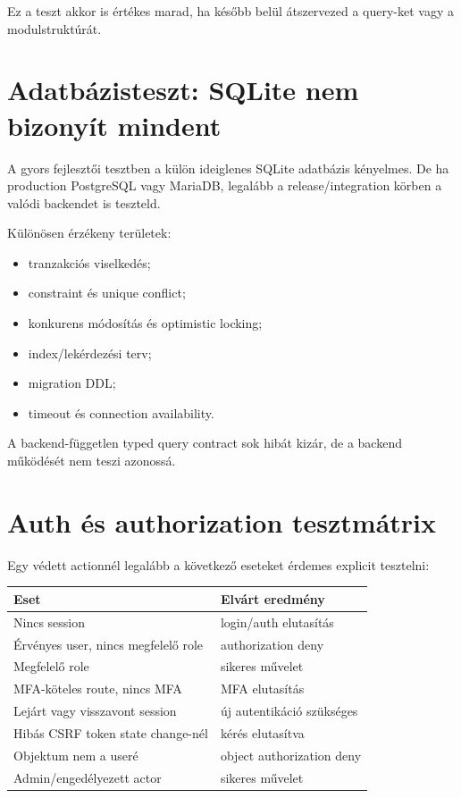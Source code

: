 Ez a teszt akkor is értékes marad, ha később belül átszervezed a query-ket vagy a modulstruktúrát.

\section{Adatbázisteszt: SQLite nem bizonyít mindent}

A gyors fejlesztői tesztben a külön ideiglenes SQLite adatbázis kényelmes. De ha production PostgreSQL vagy MariaDB, legalább a release/integration körben a valódi backendet is teszteld.

Különösen érzékeny területek:

\begin{itemize}
  \item tranzakciós viselkedés;
  \item constraint és unique conflict;
  \item konkurens módosítás és optimistic locking;
  \item index/lekérdezési terv;
  \item migration DDL;
  \item timeout és connection availability.
\end{itemize}

A backend-független typed query contract sok hibát kizár, de a backend működését nem teszi azonossá.

\section{Auth és authorization tesztmátrix}

Egy védett actionnél legalább a következő eseteket érdemes explicit tesztelni:

\begin{longtable}{L{0.42\textwidth}L{0.44\textwidth}}
\toprule
Eset & Elvárt eredmény \\
\midrule
Nincs session & login/auth elutasítás \\
Érvényes user, nincs megfelelő role & authorization deny \\
Megfelelő role & sikeres művelet \\
MFA-köteles route, nincs MFA & MFA elutasítás \\
Lejárt vagy visszavont session & új autentikáció szükséges \\
Hibás CSRF token state change-nél & kérés elutasítva \\
Objektum nem a useré & object authorization deny \\
Admin/engedélyezett actor & sikeres művelet \\
\bottomrule
\end{longtable}

